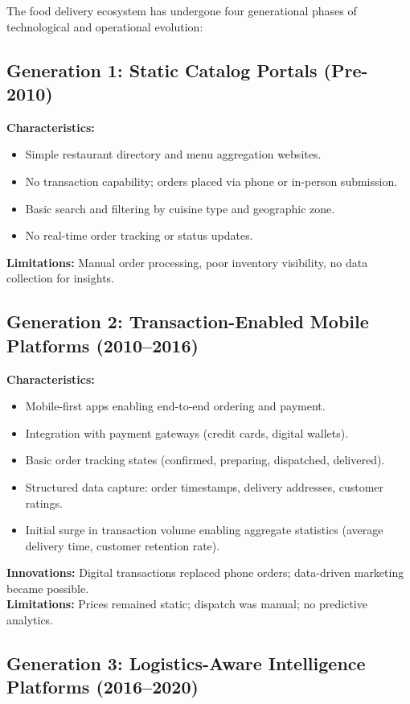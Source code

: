 \documentclass[12pt,a4paper]{report}
\begin{document}
The food delivery ecosystem has undergone four generational phases of technological and operational evolution:

\subsection{Generation 1: Static Catalog Portals (Pre-2010)}

\textbf{Characteristics:}
\begin{itemize}
    \item Simple restaurant directory and menu aggregation websites.
    \item No transaction capability; orders placed via phone or in-person submission.
    \item Basic search and filtering by cuisine type and geographic zone.
    \item No real-time order tracking or status updates.
\end{itemize}

\textbf{Limitations:} Manual order processing, poor inventory visibility, no data collection for insights.

\subsection{Generation 2: Transaction-Enabled Mobile Platforms (2010--2016)}

\textbf{Characteristics:}
\begin{itemize}
    \item Mobile-first apps enabling end-to-end ordering and payment.
    \item Integration with payment gateways (credit cards, digital wallets).
    \item Basic order tracking states (confirmed, preparing, dispatched, delivered).
    \item Structured data capture: order timestamps, delivery addresses, customer ratings.
    \item Initial surge in transaction volume enabling aggregate statistics (average delivery time, customer retention rate).
\end{itemize}

\textbf{Innovations:} Digital transactions replaced phone orders; data-driven marketing became possible. \\
\textbf{Limitations:} Prices remained static; dispatch was manual; no predictive analytics.

\subsection{Generation 3: Logistics-Aware Intelligence Platforms (2016--2020)}
\end{document}
